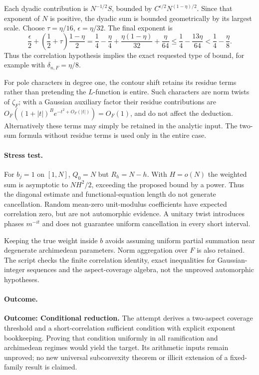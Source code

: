 \documentclass[11pt,a4paper]{article}
\numberwithin{equation}{section}
\begin{document}
Each dyadic contribution is $N^{-1/2}S$, bounded by
$C^{\epsilon/2}N^{(1-\eta)/2}$. Since that exponent of $N$ is positive,
the dyadic sum is bounded geometrically by its largest scale. Choose
$\tau=\eta/16$, $\epsilon=\eta/32$. The final exponent is
\[
 \frac\epsilon2+\left(\frac12+\tau\right)\frac{1-\eta}{2}
 =\frac14-\frac\eta4+\frac{\eta(1-\eta)}{32}+\frac\eta{64}
 \le\frac14-\frac{13\eta}{64}<\frac14-\frac\eta8.
\]
Thus the correlation hypothesis implies the exact requested type of bound,
for example with $\delta_{n,F}=\eta/8$.

For pole characters in degree one, the contour shift retains its residue
terms rather than pretending the $L$-function is entire. Such characters
are norm twists of $\zeta_F$; with a Gaussian auxiliary factor their
residue contributions are
$O_F((1+|t|)^B e^{-t^2+O_F(|t|)})=O_F(1)$, and do not affect the deduction.
Alternatively these terms may simply be retained in the analytic input.
The two-sum formula without residue terms is used only in the entire case.

\paragraph{Stress test.}
For $b_j=1$ on $[1,N]$, $Q_0=N$ but $R_h=N-h$. With $H=o(N)$ the weighted
sum is asymptotic to $NH^2/2$, exceeding the proposed bound by a power.
Thus the diagonal estimate and functional-equation length do not generate
cancellation. Random mean-zero unit-modulus coefficients have expected
correlation zero, but are not automorphic evidence. A unitary twist
introduces phases $m^{-it}$ and does not guarantee uniform cancellation
in every short interval.

Keeping the true weight inside $b$ avoids assuming uniform partial summation
near degenerate archimedean parameters. Norm aggregation over $F$ is also
retained. The script checks the finite correlation identity, exact inequalities
for Gaussian-integer sequences and the aspect-coverage algebra, not the
unproved automorphic hypotheses.

\paragraph{Outcome.}
\textbf{Outcome: Conditional reduction.}
The attempt derives a two-aspect coverage threshold and a short-correlation
sufficient condition with explicit exponent bookkeeping. Proving that
condition uniformly in all ramification and archimedean regimes would yield
the target. Its arithmetic inputs remain unproved; no new universal
subconvexity theorem or illicit extension of a fixed-family result is claimed.
\end{document}
